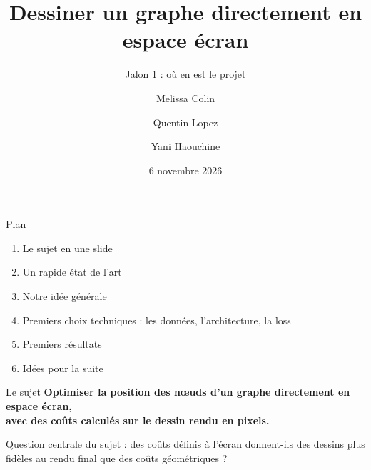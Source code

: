 \documentclass[aspectratio=169,11pt]{beamer}
\title{Dessiner un graphe directement en espace écran}
\subtitle{Jalon 1 : où en est le projet}
\author{Melissa Colin \and Quentin Lopez \and Yani Haouchine}
\institute{ENSEIRB-MATMECA 3A, projet semestriel \quad·\quad Encadrant : Romain Giot (LaBRI)}
\date{6 novembre 2026}
\begin{document}
\maketitle

\begin{frame}{Plan}
\begin{enumerate}
\setlength{\itemsep}{6pt}
\item Le sujet en une slide
\item Un rapide état de l'art
\item Notre idée générale
\item Premiers choix techniques : les données, l'architecture, la loss
\item Premiers résultats
\item Idées pour la suite
\end{enumerate}
\end{frame}

\begin{frame}{Le sujet}
\centering
\textbf{Optimiser la position des nœuds d'un graphe directement en espace écran,}\\\textbf{avec des coûts calculés sur le dessin rendu en pixels.}

\vspace{0.6cm}

\vspace{0.5cm}
\small Question centrale du sujet : des coûts définis à l'écran donnent-ils des dessins plus fidèles au rendu final que des coûts géométriques ?
\end{frame}
\end{document}
